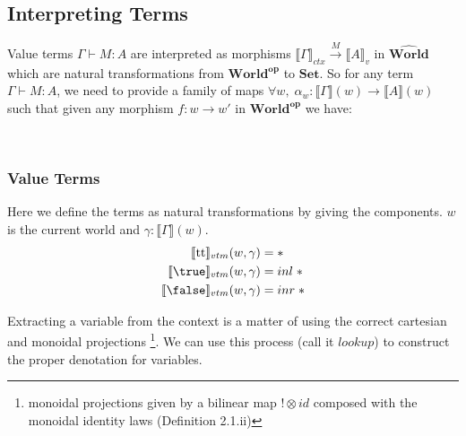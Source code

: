\documentclass{article}
\newcommand{\ttt}{\textrm{tt}}
\newcommand{\pworld}{\widehat{\mathbf{World}}}
\begin{document}
\subsection{Interpreting Terms}
Value terms $\Gamma \vdash M : A$ are interpreted as morphisms 
$\llbracket \Gamma \rrbracket_{ctx} \xrightarrow{M} \llbracket A \rrbracket_{v}$ in $\pworld$ which are natural transformations 
from $\mathbf{World^{op}}$ to $\mathbf{Set}$. So for any term $\Gamma \vdash M : A$, we need to provide a family of maps 
$\forall w ,\; \alpha_w : \llbracket \Gamma \rrbracket(w) \rightarrow \llbracket A \rrbracket(w)$ such that given any morphism 
$f : w \rightarrow w'$ in $\mathbf{World^{op}}$ we have:
\begin{figure}[!ht]
    \centering

\end{figure}\\
\subsubsection{Value Terms}
Here we define the terms as natural transformations by giving the components. $w$ is the current world and 
$\gamma : \llbracket \Gamma \rrbracket(w)$. 
\begin{align*}
    \llbracket  \ttt \rrbracket_{vtm}(w, \gamma) &= *\\
    \llbracket  \true \rrbracket_{vtm}(w,\gamma) &= inl \;*\\
    \llbracket  \false \rrbracket_{vtm}(w,\gamma) &= inr \;*\\
\end{align*}

Extracting a variable from the context is a matter of using the correct cartesian and monoidal projections
\footnote{monoidal projections given by a bilinear map $! \otimes id$ composed with the monoidal identity laws 
\cite{JACOBS199473}(Definition 2.1.ii)}. We can use this process (call it $lookup$) to construct the proper 
denotation for variables.
\end{document}
